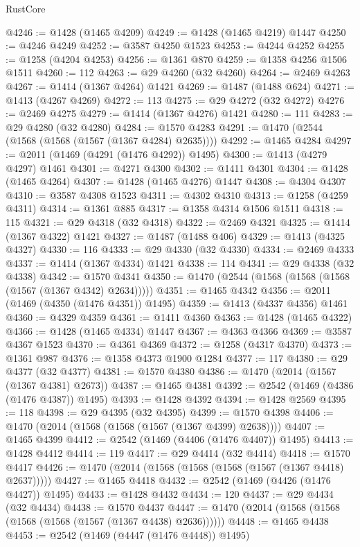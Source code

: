 \begin{lexlean}{RustCore}
\begin{coremodule}
@4246 := @1428 (@1465 @4209)
@4249 := @1428 (@1465 @4219) @1447
@4250 := @4246 @4249
@4252 := @3587 @4250 @1523
@4253 := @4244 @4252
@4255 := @1258 (@4204 @4253)
@4256 := @1361 @870
@4259 := @1358 @4256 @1506 @1511
@4260 := 112
@4263 := @29 @4260 (@32 @4260)
@4264 := @2469 @4263
@4267 := @1414 (@1367 @4264) @1421
@4269 := @1487 (@1488 @624)
@4271 := @1413 (@4267 @4269)
@4272 := 113
@4275 := @29 @4272 (@32 @4272)
@4276 := @2469 @4275
@4279 := @1414 (@1367 @4276) @1421
@4280 := 111
@4283 := @29 @4280 (@32 @4280)
@4284 := @1570 @4283
@4291 := @1470 (@2544 (@1568 (@1568 (@1567 (@1367 @4284) @2635))))
@4292 := @1465 @4284
@4297 := @2011 (@1469 (@4291 (@1476 @4292)) @1495)
@4300 := @1413 (@4279 @4297) @1461
@4301 := @4271 @4300
@4302 := @1411 @4301
@4304 := @1428 (@1465 @4264)
@4307 := @1428 (@1465 @4276) @1447
@4308 := @4304 @4307
@4310 := @3587 @4308 @1523
@4311 := @4302 @4310
@4313 := @1258 (@4259 @4311)
@4314 := @1361 @885
@4317 := @1358 @4314 @1506 @1511
@4318 := 115
@4321 := @29 @4318 (@32 @4318)
@4322 := @2469 @4321
@4325 := @1414 (@1367 @4322) @1421
@4327 := @1487 (@1488 @406)
@4329 := @1413 (@4325 @4327)
@4330 := 116
@4333 := @29 @4330 (@32 @4330)
@4334 := @2469 @4333
@4337 := @1414 (@1367 @4334) @1421
@4338 := 114
@4341 := @29 @4338 (@32 @4338)
@4342 := @1570 @4341
@4350 := @1470 (@2544 (@1568 (@1568 (@1568 (@1567 (@1367 @4342) @2634)))))
@4351 := @1465 @4342
@4356 := @2011 (@1469 (@4350 (@1476 @4351)) @1495)
@4359 := @1413 (@4337 @4356) @1461
@4360 := @4329 @4359
@4361 := @1411 @4360
@4363 := @1428 (@1465 @4322)
@4366 := @1428 (@1465 @4334) @1447
@4367 := @4363 @4366
@4369 := @3587 @4367 @1523
@4370 := @4361 @4369
@4372 := @1258 (@4317 @4370)
@4373 := @1361 @987
@4376 := @1358 @4373 @1900 @1284
@4377 := 117
@4380 := @29 @4377 (@32 @4377)
@4381 := @1570 @4380
@4386 := @1470 (@2014 (@1567 (@1367 @4381) @2673))
@4387 := @1465 @4381
@4392 := @2542 (@1469 (@4386 (@1476 @4387)) @1495)
@4393 := @1428 @4392
@4394 := @1428 @2569
@4395 := 118
@4398 := @29 @4395 (@32 @4395)
@4399 := @1570 @4398
@4406 := @1470 (@2014 (@1568 (@1568 (@1567 (@1367 @4399) @2638))))
@4407 := @1465 @4399
@4412 := @2542 (@1469 (@4406 (@1476 @4407)) @1495)
@4413 := @1428 @4412
@4414 := 119
@4417 := @29 @4414 (@32 @4414)
@4418 := @1570 @4417
@4426 := @1470 (@2014 (@1568 (@1568 (@1568 (@1567 (@1367 @4418) @2637)))))
@4427 := @1465 @4418
@4432 := @2542 (@1469 (@4426 (@1476 @4427)) @1495)
@4433 := @1428 @4432
@4434 := 120
@4437 := @29 @4434 (@32 @4434)
@4438 := @1570 @4437
@4447 := @1470 (@2014 (@1568 (@1568 (@1568 (@1568 (@1567 (@1367 @4438) @2636))))))
@4448 := @1465 @4438
@4453 := @2542 (@1469 (@4447 (@1476 @4448)) @1495)

\end{coremodule}
\end{lexlean}
